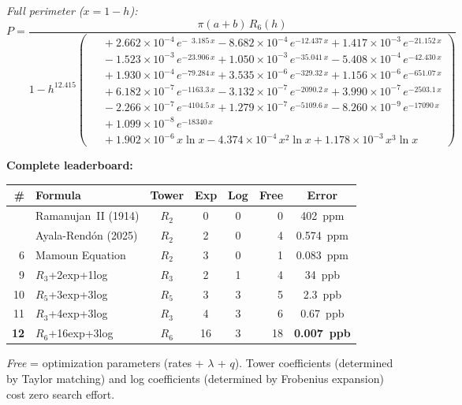 \documentclass[12pt]{article}
\begin{document}
\emph{Full perimeter ($x = 1-h$):}
\begin{equation}\label{eq:grand-champion}
\boxed{P = \frac{\pi(a{+}b)\,R_6(h)}{1 - h^{12.415}\!\left(\!\begin{aligned}
  &\; +2.662{\times}10^{-4}\,e^{-\phantom{0}3.185\,x}
     -8.682{\times}10^{-4}\,e^{-12.437\,x}
     +1.417{\times}10^{-3}\,e^{-21.152\,x} \\[-3pt]
  &\; -1.523{\times}10^{-3}\,e^{-23.906\,x}
     +1.050{\times}10^{-3}\,e^{-35.041\,x}
     -5.408{\times}10^{-4}\,e^{-42.430\,x} \\[-3pt]
  &\; +1.930{\times}10^{-4}\,e^{-79.284\,x}
     +3.535{\times}10^{-6}\,e^{-329.32\,x}
     +1.156{\times}10^{-6}\,e^{-651.07\,x} \\[-3pt]
  &\; +6.182{\times}10^{-7}\,e^{-1163.3\,x}
     -3.132{\times}10^{-7}\,e^{-2090.2\,x}
     +3.990{\times}10^{-7}\,e^{-2503.1\,x} \\[-3pt]
  &\; -2.266{\times}10^{-7}\,e^{-4104.5\,x}
     +1.279{\times}10^{-7}\,e^{-5109.6\,x}
     -8.260{\times}10^{-9}\,e^{-17090\,x} \\[-3pt]
  &\; +1.099{\times}10^{-8}\,e^{-18340\,x} \\[3pt]
  &\; +1.902{\times}10^{-6}\,x\ln x
     -4.374{\times}10^{-4}\,x^2\ln x
     +1.178{\times}10^{-3}\,x^3\ln x
\end{aligned}\!\right)}}
\end{equation}

\bigskip

\noindent\textbf{Complete leaderboard:}
\begin{center}
\begin{tabular}{@{}rlcccrc@{}}
\toprule
\# & Formula & Tower & Exp & Log & Free & Error \\
\midrule
  & Ramanujan~II (1914)       & $R_2$ & 0  & 0 &  0 & 402~ppm \\
  & Ayala-Rend\'on (2025)     & $R_2$ & 2  & 0 &  4 & 0.574~ppm \\
6 & Mamoun Equation           & $R_2$ & 3  & 0 &  1 & 0.083~ppm \\
9 & $R_3$+2exp+1log           & $R_3$ & 2  & 1 &  4 & 34~ppb \\
10& $R_5$+3exp+3log           & $R_5$ & 3  & 3 &  5 & 2.3~ppb \\
11& $R_3$+4exp+3log           & $R_3$ & 4  & 3 &  6 & 0.67~ppb \\
\textbf{12}& $R_6$+16exp+3log  & $R_6$ & 16 & 3 & 18 & \textbf{0.007~ppb} \\
\bottomrule
\end{tabular}
\end{center}
\noindent \emph{Free} = optimization parameters (rates + $\lambda$ + $q$).
Tower coefficients (determined by Taylor matching) and log coefficients (determined by Frobenius expansion) cost zero search effort.
\end{document}
